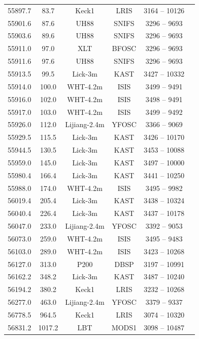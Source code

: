 \documentclass[a4paper,oneside,12pt, class=Latex/Classes/PhDthesisPSnPDF, crop=false]{standalone}
\begin{document}
\begin{longtable}{cccccc}
 55897.7 & 83.7 & Keck1  & LRIS & 3164 -- 10126 & \citet{spec_Lick-3m} \\
 55901.6 & 87.6 & UH88   & SNIFS & 3296 -- 9693 & \citet{spec_UH88} \\
 55903.6 & 89.6 & UH88   & SNIFS & 3296 -- 9693 & \citet{spec_UH88} \\
 55911.0 & 97.0 & XLT   & BFOSC & 3296 -- 9693 & \citet{spec_Lijiang-2.4m} \\
 55911.6 & 97.6 & UH88   & SNIFS & 3296 -- 9693 & \citet{spec_UH88} \\
 55913.5 & 99.5 & Lick-3m  & KAST & 3427 -- 10332 & \citet{spec_Lick-3m} \\
 55914.0 & 100.0 & WHT-4.2m  & ISIS & 3499 -- 9491 & \citet{WHT_spec_100d} \\
 55916.0 & 102.0 & WHT-4.2m  & ISIS & 3498 -- 9491 & \citet{PTF_1, PTF_2} \\
 55917.0 & 103.0 & WHT-4.2m  & ISIS & 3499 -- 9492 & \citet{PTF_1, PTF_2} \\
 55926.0 & 112.0 & Lijiang-2.4m & YFOSC & 3366 -- 9069 & \citet{spec_Lijiang-2.4m} \\
 55929.5 & 115.5 & Lick-3m  & KAST & 3426 -- 10170 & \citet{spec_Lick-3m} \\
 55944.5 & 130.5 & Lick-3m  & KAST & 3453 -- 10088 & \citet{spec_Lick-3m} \\
 55959.0 & 145.0 & Lick-3m  & KAST & 3497 -- 10000 & \citet{PTF_1, PTF_2} \\
 55980.4 & 166.4 & Lick-3m  & KAST & 3441 -- 10250 & \citet{spec_Lick-3m} \\
 55988.0 & 174.0 & WHT-4.2m  & ISIS & 3495 -- 9982 & \citet{spec_WHT-4.2m} \\
 56019.4 & 205.4 & Lick-3m  & KAST & 3438 -- 10324 & \citet{spec_WHT-4.2m} \\
 56040.4 & 226.4 & Lick-3m  & KAST & 3437 -- 10178 & \citet{spec_WHT-4.2m} \\
 56047.0 & 233.0 & Lijiang-2.4m & YFOSC & 3392 -- 9053 & \citet{spec_Lijiang-2.4m} \\
 56073.0 & 259.0 & WHT-4.2m  & ISIS & 3495 -- 9483 & \citet{spec_WHT-4.2m} \\
 56103.0 & 289.0 & WHT-4.2m  & ISIS & 3423 -- 10268 & \citet{spec_WHT-4.2m} \\
 56127.0 & 313.0 & P200   & DBSP & 3197 -- 10991 & \citet{PTF_1, PTF_2} \\
 56162.2 & 348.2 & Lick-3m  & KAST & 3487 -- 10240 & \citet{spec_WHT-4.2m} \\
 56194.2 & 380.2 & Keck1  & LRIS & 3232 -- 10268 & \citet{spec_Lick-3m} \\
 56277.0 & 463.0 & Lijiang-2.4m & YFOSC & 3379 -- 9337 & \citet{spec_Lijiang-2.4m} \\
 56778.5 & 964.5 & Keck1  & LRIS & 3074 -- 10320 & \citet{spec_Lick-3m+Keck1} \\
 56831.2 & 1017.2& LBT   & MODS1 & 3098 -- 10487 & \citet{spec_LBT} \\
\end{longtable}
\normalsize
\end{document}
